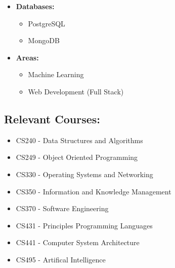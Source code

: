 \documentclass[12pt, oneside, a4paper]{article}
\begin{document}
\begin{paracol}{2}
\begin{leftcolumn}
\begin{itemize}
    \item \textbf{Databases:}
          \begin{itemize}
              \item PostgreSQL
              \item MongoDB
          \end{itemize}
    \item \textbf{Areas:}
        \begin{itemize}
            \item Machine Learning
            \item Web Development (Full Stack)
        \end{itemize}
\end{itemize}
\end{leftcolumn}

\begin{rightcolumn}
    \section*{Relevant Courses:}
\begin{itemize}
    \scriptsize
    \item CS240 - Data Structures and Algorithms
    \item CS249 - Object Oriented Programming
    \item CS330 - Operating Systems and Networking
    \item CS350 - Information and Knowledge Management
    \item CS370 - Software Engineering
    \item CS431 - Principles Programming Languages
    \item CS441 - Computer System Architecture
    \item CS495 - Artifical Intelligence
\end{itemize}
\end{rightcolumn}
\end{paracol}
        
\end{document}
